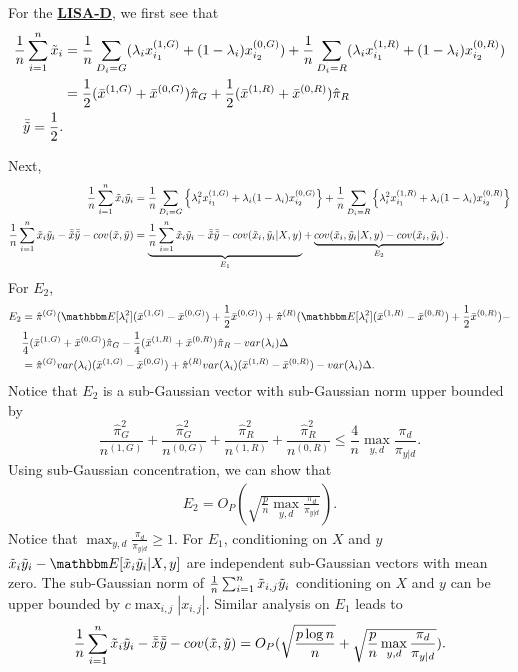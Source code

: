 For the \underline{\textbf{LISA-D}}, we first see that
\begin{align*}
  \frac{1}{n}\sum_{i=1}^n\tilde{x}_i&=\frac{1}{n}\sum_{D_i=G}(\lambda_i x_{i_1}^{(1,G)}+(1-\lambda_i)x_{i_2}^{(0,G)})+\frac{1}{n}\sum_{D_i=R}(\lambda_i x_{i_1}^{(1,R)}+(1-\lambda_i)x_{i_2}^{(0,R)})\\
  &=\frac{1}{2}(\bar{x}^{(1,G)}+\bar{x}^{(0,G)})\hat{\pi}_G+\frac{1}{2}(\bar{x}^{(1,R)}+\bar{x}^{(0,R)})\hat{\pi}_R\\
  \bar{\tilde{y}}=\frac{1}{2}.
\end{align*}

Next,
\begin{align*}
    \frac{1}{n}\sum_{i=1}^n\tilde{x}_i\tilde{y}_i&=  \frac{1}{n}\sum_{D_i=G}\left\{\lambda_i^2x_{i_1}^{(1,G)}+\lambda_i(1-\lambda_i)x_{i_2}^{(0,G)}\right\}+\frac{1}{n}\sum_{D_i=R}\left\{\lambda_i^2x_{i_1}^{(1,R)}+\lambda_i(1-\lambda_i)x_{i_2}^{(0,R)}\right\}\\
  \frac{1}{n}\sum_{i=1}^n\tilde{x}_i\tilde{y}_i -\bar{\tilde{x}}\bar{\tilde{y}}-cov(\tilde{x},\tilde{y}) &=\underbrace{\frac{1}{n}\sum_{i=1}^n \tilde{x}_i\tilde{y}_i-\bar{\tilde{x}}\bar{\tilde{y}}-cov(\tilde{x}_i,\tilde{y}_i|X,y)}_{E_1}+\underbrace{cov(\tilde{x}_i,\tilde{y}_i|X,y)-cov(\tilde{x}_i,\tilde{y}_i)}_{E_2}.
\end{align*}
For $E_2$,
\begin{align*}
    E_2&=\hat{\pi}^{(G)}(\E[\lam_i^2](\bar{x}^{(1,G)}-\bar{x}^{(0,G)})+\frac{1}{2}\bar{x}^{(0,G)})+\hat{\pi}^{(R)}(\E[\lam_i^2](\bar{x}^{(1,R)}-\bar{x}^{(0,R)})+\frac{1}{2}\bar{x}^{(0,R)})-\\
   & \frac{1}{4}(\bar{x}^{(1,G)}+\bar{x}^{(0,G)})\hat{\pi}_G-\frac{1}{4}(\bar{x}^{(1,R)}+\bar{x}^{(0,R)})\hat{\pi}_R-var(\lam_i)\Delta\\
    & =\hat{\pi}^{(G)}var(\lam_i)(\bar{x}^{(1,G)}-\bar{x}^{(0,G)})+\hat{\pi}^{(R)}var(\lam_i)(\bar{x}^{(1,R)}-\bar{x}^{(0,R)})-var(\lam_i)\Delta.
\end{align*}
Notice that $E_2$ is a sub-Gaussian vector with sub-Gaussian norm upper bounded by
\[
   \frac{\hat{\pi}_G^2}{n^{(1,G)}}+\frac{\hat{\pi}_G^2}{n^{(0,G)}}+\frac{\hat{\pi}_R^2}{n^{(1,R)}}+\frac{\hat{\pi}_R^2}{n^{(0,R)}}\leq \frac{4}{n}\max_{y,d}\frac{\pi_d}{\pi_{y|d}}.
\]
Using sub-Gaussian concentration, we can show that
\begin{align*}
    E_2=O_P(\sqrt{\frac{p}{n}\max_{y,d}\frac{\pi_d}{\pi_{y|d}}}).
\end{align*}
Notice that $\max_{y,d}\frac{\pi_d}{\pi_{y|d}}\geq 1$.
For $E_1$, conditioning on $X$ and $y$ $\tx_i\ty_i-\E[\tx_i\ty_i|X,y]$ are independent sub-Gaussian vectors with mean zero. The sub-Gaussian norm of $\frac{1}{n}\sum_{i=1}^n\tilde{x}_{i,j}\tilde{y}_i$ conditioning on $X$ and $y$ can be upper bounded by $c\max_{i,j}|x_{i,j}|$. Similar analysis on $E_1$ leads to
\begin{align*}
     \frac{1}{n}\sum_{i=1}^n\tilde{x}_i\tilde{y}_i -\bar{\tilde{x}}\bar{\tilde{y}}-cov(\tilde{x},\tilde{y})=O_P(\sqrt{\frac{p\log n}{n}}+\sqrt{\frac{p}{n}\max_{y,d}\frac{\pi_d}{\pi_{y|d}}}).
\end{align*}

